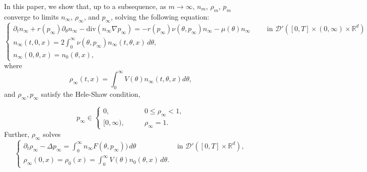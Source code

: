 \documentclass{amsart}
\def\R{\mathbb R}
\begin{document}
In this paper, we show that, up to a subsequence, as $m \rightarrow \infty$, $n_m$, $\rho_m$, $p_m$ converge to limits $n_\infty$, $\rho_\infty$, and $p_\infty$, solving the following equation:
\begin{equation}\label{n.lim}
\begin{cases}
    \partial_t n_\infty +r(p_\infty)\partial_\theta n_\infty -\text{div}(n_\infty \nabla p_\infty)=-r(p_\infty)\nu(\theta,p_\infty)n_\infty-\mu(\theta)n_\infty\qquad \text{ in } \mathcal{D}'([0,T]\times(0,\infty)\times \R^d)\\
        n_\infty(t,0,x)=2\int_{0}^{\infty}\nu(\theta,p_\infty)n_\infty(t,\theta,x)\,d\theta, \\
        n_\infty(0,\theta,x)=n_{0}(\theta,x),
\end{cases}
\end{equation}
where 
\begin{equation}\label{rhoinf}
\rho_\infty(t,x)=\int_{0}^{\infty}V(\theta)n_\infty(t,\theta,x)d\theta,
\end{equation}
and $\rho_\infty,p_\infty$ satisfy the Hele-Shaw condition, 

\begin{equation}\label{hs}
p_\infty\in\begin{cases}0, \qquad &0 \leq \rho_\infty <1, \\
[0,\infty), \qquad &\rho_\infty=1.
\end{cases}
\end{equation}
Further, $\rho_\infty$ solves
\begin{equation}\label{rho.lim}
\begin{cases}
\partial_t\rho_\infty -\Delta p_\infty =\int_{0}^{\infty}n_\infty F(\theta,p_\infty))\,d\theta\qquad & \text{ in } \mathcal{D}'([0,T]\times \R^d),
    \\
    \rho_\infty(0,x)=\rho_{0}(x)=\int_{0}^{\infty}V(\theta)n_{0}(\theta,x)\,d\theta.
    \end{cases}
\end{equation}
\end{document}
